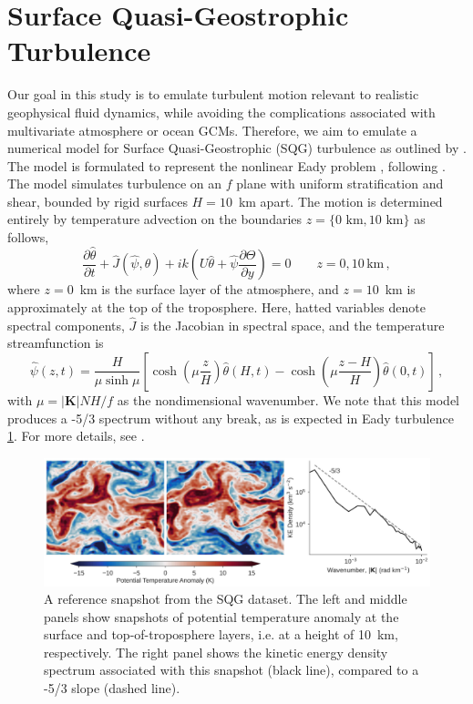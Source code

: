 \section{Surface Quasi-Geostrophic Turbulence}
\label{sec:sqg}

Our goal in this study is to emulate turbulent motion relevant to realistic
geophysical fluid dynamics, while avoiding the complications
associated with multivariate atmosphere or ocean GCMs.
Therefore, we aim to emulate a numerical model for Surface Quasi-Geostrophic
(SQG) turbulence as outlined by \citet{tulloch_note_2009}.
The model is formulated to represent the nonlinear Eady problem
\citep{eady_long_1949}, following \citet{blumen_uniform_1978-1}.
The model simulates turbulence
on an $f$ plane with uniform stratification and shear, bounded by rigid
surfaces $H=10$~km apart.
The motion is determined entirely by temperature advection on the boundaries
$z=\{0\text{~km},10\text{~km}\}$ as follows,
\begin{equation*}
    \dfrac{\partial \hat{\theta}}{\partial t} +
    \hat{J}(\hat{\psi}, \hat{\theta}) + ik\left(U \hat{\theta} +
        \hat{\psi}\dfrac{\partial \Theta}{\partial y}\right)
    = 0 \qquad z = 0, 10\,\text{km} \, ,
\end{equation*}
where $z=0$~km is the surface layer of the atmosphere, and $z=10$~km is
approximately at the top of the troposphere.
Here, hatted variables denote spectral components, $\hat{J}$ is the Jacobian in
spectral space, and the temperature streamfunction is
\begin{equation*}
    \hat{\psi}(z,t) = \dfrac{H}{\mu\sinh\mu}
    \left[ \cosh\left(\mu\dfrac{z}{H}\right) \hat{\theta}(H,t)
        - \cosh\left(\mu\dfrac{z-H}{H}\right) \hat{\theta}(0,t)
    \right]\, ,
\end{equation*}
with $\mu = |\mathbf{K}| NH/f$ as the nondimensional wavenumber.
We note that this model produces a -5/3 spectrum without any break,
as is expected in Eady turbulence \cref{fig:sqg-reference}.
For more details, see \citep{tulloch_note_2009}.


\begin{figure}
    \centering
    \includegraphics[width=\textwidth]{../figures/sqg_reference_plot.jpg}
    \caption{A reference snapshot from the SQG dataset. The left and middle panels
        show snapshots of potential temperature anomaly at the surface and
        top-of-troposphere layers, i.e. at a height of 10~km, respectively.
        The right panel shows the kinetic energy density spectrum associated
        with this snapshot (black line), compared to a -5/3 slope (dashed line).
    }
    \label{fig:sqg-reference}
\end{figure}

